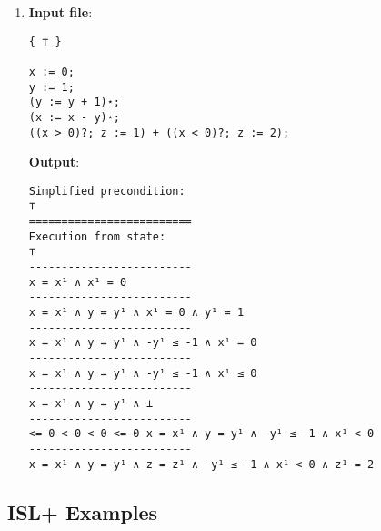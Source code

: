 \documentclass[parskip=half]{scrartcl}
\begin{document}
\begin{enumerate}
\item 
\textbf{Input file}: 
\begin{verbatim}
{ ⊤ }

x := 0;
y := 1;
(y := y + 1)⋆;
(x := x - y)⋆;
((x > 0)?; z := 1) + ((x < 0)?; z := 2);
\end{verbatim}

\textbf{Output}: 
\begin{verbatim}
Simplified precondition:
⊤
=========================
Execution from state:
⊤
-------------------------
x = x¹ ∧ x¹ = 0
-------------------------
x = x¹ ∧ y = y¹ ∧ x¹ = 0 ∧ y¹ = 1
-------------------------
x = x¹ ∧ y = y¹ ∧ -y¹ ≤ -1 ∧ x¹ = 0
-------------------------
x = x¹ ∧ y = y¹ ∧ -y¹ ≤ -1 ∧ x¹ ≤ 0
-------------------------
x = x¹ ∧ y = y¹ ∧ ⊥
-------------------------
<= 0 < 0 < 0 <= 0 x = x¹ ∧ y = y¹ ∧ -y¹ ≤ -1 ∧ x¹ < 0
-------------------------
x = x¹ ∧ y = y¹ ∧ z = z¹ ∧ -y¹ ≤ -1 ∧ x¹ < 0 ∧ z¹ = 2
\end{verbatim}

\end{enumerate}

\subsection{ISL+ Examples}
\end{document}
